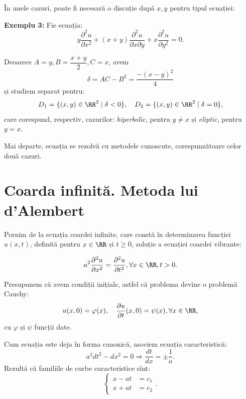\vspace{0.3cm}

În unele cazuri, poate fi necesară o discuție după $ x, y $ pentru tipul ecuației:

\textbf{Exemplu 3:} Fie ecuația:
\[
    y \dfrac{\partial^2 u}{\partial x^2} + (x + y) \dfrac{\partial^2 u}{\partial x\partial y} + %
    x \dfrac{\partial^2 u}{\partial y^2} = 0.
\]

Deoarece $ A = y, B = \dfrac{x + y}{2}, C = x $, avem
\[
    \delta = AC - B^2 = \dfrac{-(x - y)^2}{4}
\]
și studiem separat pentru:
\[
    D_1 = \{(x, y) \in \RR^2 \mid \delta < 0 \}, \quad %
    D_2 = \{(x, y) \in \RR^2 \mid \delta = 0 \},
\]
care corespund, respectiv, cazurilor: \emph{hiperbolic}, pentru $ y \neq x $ și
\emph{eliptic}, pentru $ y = x $.

Mai departe, ecuația se rezolvă cu metodele cunoscute, corespunzătoare celor
două cazuri.


\section{Coarda infinită. Metoda lui d'Alembert}

\indent\indent Pornim de la ecuația coardei infinite, care constă în determinarea funcției
$ u(x, t) $, definită pentru $ x \in \RR $ și $ t \geq 0 $, soluție a ecuației
coardei vibrante:

\[
    a^2 \dfrac{\partial^2 u}{\partial x^2} = \dfrac{\partial^2 u}{\partial t^2}, %
    \forall x \in \RR, t > 0.
\]

Presupunem că avem condiții inițiale, astfel că problema devine o problemă Cauchy:
\[
    u(x, 0) = \varphi(x), \quad \dfrac{\partial u}{\partial t}(x, 0) = \psi(x), \forall x \in \RR,
\]
cu $ \varphi $ și $ \psi $ funcții date.

Cum ecuația este deja în forma canonică, asociem ecuația caracteristică:
\[
    a^2 dt^2 - dx^2 = 0 \Rightarrow \dfrac{dt}{dx} = \pm\dfrac{1}{a}.
\]
Rezultă că familiile de curbe caracteristice sînt:
\[
    \begin{cases}
        x - at &= c_1 \\
        x + at &= c_2
    \end{cases}.
\]

